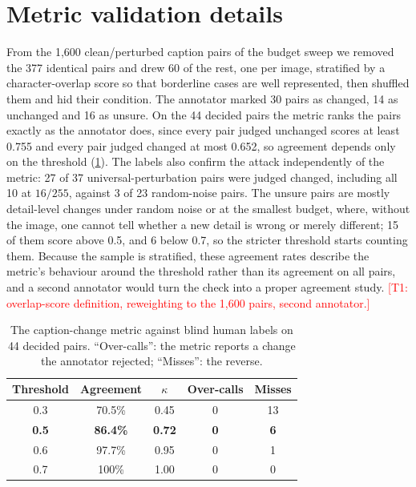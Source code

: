 \documentclass[10pt,twocolumn,letterpaper]{article}
\newcommand{\pend}[1]{\textcolor{red}{[#1]}}
\begin{document}
\section{Metric validation details}
\label{app:metric}

From the 1,600 clean/perturbed caption pairs of the budget sweep we removed the 377 identical pairs and drew 60 of the rest, one per image, stratified by a character-overlap score so that borderline cases are well represented, then shuffled them and hid their condition. The annotator marked 30 pairs as changed, 14 as unchanged and 16 as unsure. On the 44 decided pairs the metric ranks the pairs exactly as the annotator does, since every pair judged unchanged scores at least 0.755 and every pair judged changed at most 0.652, so agreement depends only on the threshold (\cref{tab:metric}). The labels also confirm the attack independently of the metric: 27 of 37 universal-perturbation pairs were judged changed, including all 10 at $16/255$, against 3 of 23 random-noise pairs. The unsure pairs are mostly detail-level changes under random noise or at the smallest budget, where, without the image, one cannot tell whether a new detail is wrong or merely different; 15 of them score above 0.5, and 6 below 0.7, so the stricter threshold starts counting them. Because the sample is stratified, these agreement rates describe the metric's behaviour around the threshold rather than its agreement on all pairs, and a second annotator would turn the check into a proper agreement study. \pend{T1: overlap-score definition, reweighting to the 1,600 pairs, second annotator.}

\begin{table}[h]
\centering
\small
\setlength{\tabcolsep}{4pt}
\begin{tabular}{@{}ccccc@{}}
\toprule
Threshold & Agreement & $\kappa$ & Over-calls & Misses \\
\midrule
0.3 & 70.5\% & 0.45 & 0 & 13 \\
\textbf{0.5} & \textbf{86.4\%} & \textbf{0.72} & \textbf{0} & \textbf{6} \\
0.6 & 97.7\% & 0.95 & 0 & 1 \\
0.7 & 100\% & 1.00 & 0 & 0 \\
\bottomrule
\end{tabular}
\caption{The caption-change metric against blind human labels on 44 decided pairs. ``Over-calls'': the metric reports a change the annotator rejected; ``Misses'': the reverse.}
\label{tab:metric}
\end{table}
\end{document}
